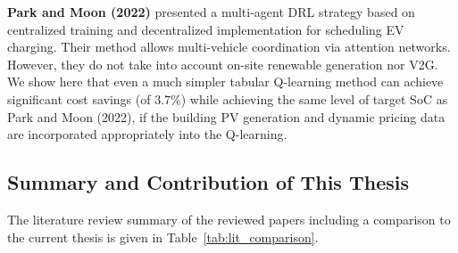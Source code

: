 \textbf{Park and Moon (2022)} \cite{park2022madrl_ev} presented a multi-agent DRL strategy based on centralized training and decentralized implementation for scheduling EV charging. Their method allows multi-vehicle coordination via attention networks. However, they do not take into account on-site renewable generation nor V2G. We show here that even a much simpler tabular Q-learning method can achieve significant cost savings (of 3.7\%) while achieving the same level of target SoC as Park and Moon (2022), if the building PV generation and dynamic pricing data are incorporated appropriately into the Q-learning.

\subsection{Summary and Contribution of This Thesis}
\label{subsec:lit_review_summary}

The literature review summary of the reviewed papers including a comparison to the current thesis is given in Table~\ref{tab:lit_comparison}.

\begin{table}[H]

\centering

\caption{Comparison of reviewed works with the present thesis}

\label{tab:lit_comparison}

\end{table}

